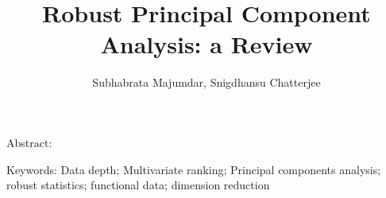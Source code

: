 \documentclass[fleqn,11pt]{article}
\numberwithin{equation}{section}
\begin{document}
\newtheorem{Theorem}{Theorem}[section]
\newtheorem{Lemma}[Theorem]{Lemma}
\newtheorem{Corollary}[Theorem]{Corollary}
\newtheorem{Proposition}[Theorem]{Proposition}
\newtheorem{Conjecture}[Theorem]{Conjecture}
\theoremstyle{definition} \newtheorem{Definition}[Theorem]{Definition}

\title{Robust Principal Component Analysis: a Review}
\date{}
\author{Subhabrata Majumdar, Snigdhansu Chatterjee}
\maketitle

Abstract:
\vspace{.5cm}

Keywords:
Data depth; Multivariate ranking; Principal components analysis; robust statistics; functional data; dimension reduction

\newpage
%










\end{document}
